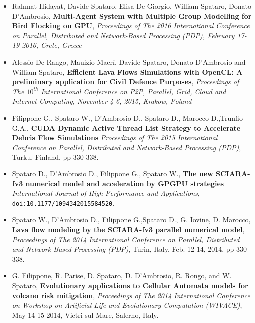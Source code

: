 \documentclass[a4paper,10pt]{article}
\begin{document}
\begin{itemize}
  \item Rahmat Hidayat, Davide Spataro, Elisa De Giorgio, William Spataro,
  Donato D'Ambrosio, \textbf{Multi-Agent System with Multiple Group Modelling
  for Bird Flocking on GPU}, \emph{Proceedings of The 2016 International
  Conference on Parallel, Distributed and Network-Based Processing (PDP),
  February 17-19 2016, Crete, Greece}

\item Alessio De Rango, Mauizio Macr\'i, Davide Spataro, Donato D'Ambrosio and
  William Spataro, \textbf{Efficient Lava Flows Simulations with OpenCL: A
  preliminary application for Civil Defence Purposes}, \emph{Proceedings of
  The $10^{th}$ International Conference on P2P, Parallel, Grid, Cloud and
  Internet Computing, November 4-6, 2015, Krakow, Poland}
  
	\item Filippone G., Spataro W., D'Ambrosio D., Spataro D., 
	Marocco D.,Trunfio G.A., \textbf{CUDA Dynamic Active Thread List Strategy 
	to Accelerate Debris Flow Simulations} \emph{Proceedings of The 2015 International Conference on Parallel, 
	Distributed and Network-Based Processing (PDP)}, Turku, Finland, pp 330-338.
	
	\item Spataro D., D'Ambrosio D., Filippone G., Spataro W., \textbf{The new
	SCIARA-fv3 numerical model and acceleration by GPGPU strategies}
	\emph{International Journal of High Performance and Applications},
	\texttt{doi:10.1177/1094342015584520}.
	
	\item Spataro W., D'Ambrosio D., Filippone G.,Spataro D., G.
    Iovine, D. Marocco, \textbf{Lava flow modeling by the SCIARA-fv3
    parallel numerical model}, \emph{Proceedings of The 2014 International
    Conference on Parallel, Distributed and Network-Based Processing (PDP)}, Turin, Italy, Feb. 12-14,
    2014, pp 330-338.
    
    \item G. Filippone, R. Parise, D. Spataro,
	D. D'Ambrosio, R. Rongo, and W. Spataro, \textbf{Evolutionary
	applications to Cellular Automata models for volcano risk mitigation},
	\emph{Proceedings of The 2014 International Conference on Workshop on Artificial Life and
	Evolutionary Computation (WIVACE)}, May 14-15 2014, Vietri sul Mare, Salerno,
	Italy.
   

\end{itemize}
\end{document}
